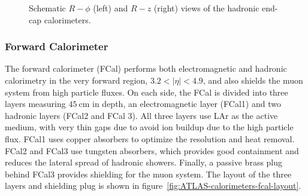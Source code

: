 \begin{figure}[htbp]
	\centering
	\caption{Schematic $R-\phi$ (left) and $R-z$ (right) views of the hadronic end-cap calorimeters.}
	\label{fig:ATLAS-calorimeters-HEC-layout}
\end{figure}


\subsubsection{Forward Calorimeter}\label{sec:ATLAS-calorimeters-fcal}
The forward calorimeter (FCal) performs both electromagnetic and hadronic calorimetry in the very forward region, $3.2<|\eta|<4.9$, and also shields the muon system from high particle fluxes. On each side, the FCal is divided into three layers measuring $\SI{45}{\centi\meter}$ in depth, an electromagnetic layer (FCal1) and two hadronic layers (FCal2 and FCal 3). All three layers use LAr as the active medium, with very thin gaps due to avoid ion buildup due to the high particle flux. FCal1 uses copper absorbers to optimize the resolution and heat removal. FCal2 and FCal3 use tungsten absorbers, which provides good containment and reduces the lateral spread of hadronic showers. Finally, a passive brass plug behind FCal3 provides shielding for the muon system. The layout of the three layers and shielding plug is shown in figure~\ref{fig:ATLAS-calorimeters-fcal-layout}. 


